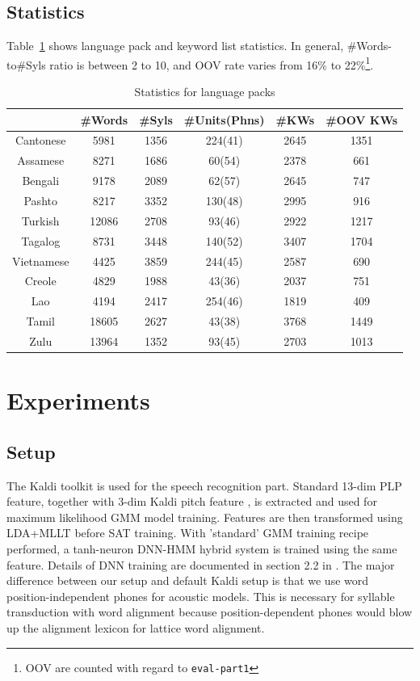\documentclass[journal]{IEEEtran}
\begin{document}
\subsection{Statistics}
Table~\ref{tab:stats} shows language pack and keyword list statistics. In general, \#Words-to\#Syls ratio is 
between 2 to 10, and OOV rate varies from 16\% to 22\%\footnote{OOV are counted with regard to \texttt{eval-part1}}.

\begin{table}[!t]
  \caption{Statistics for language packs}
  \label{tab:stats}
  \centering
  \begin{tabular}{|c|c|c|c|c|c|}
    \hline
    & \#Words & \#Syls & \#Units(Phns) & \#KWs & \#OOV KWs \\
    \hline
    Cantonese & 5981    & 1356   & 224(41)    &  2645 & 1351 \\
    Assamese  & 8271    & 1686   & 60(54)     &  2378 & 661 \\
    Bengali   & 9178    & 2089   & 62(57)     &  2645 & 747 \\
    Pashto    & 8217    & 3352   & 130(48)    &  2995 & 916 \\
    Turkish   & 12086   & 2708   & 93(46)     &  2922 & 1217 \\
    Tagalog   & 8731    & 3448   & 140(52)    &  3407 & 1704 \\
    Vietnamese& 4425    & 3859   & 244(45)    &  2587 & 690 \\
    Creole    & 4829    & 1988   & 43(36)     &  2037 & 751 \\
    Lao       & 4194    & 2417   & 254(46)    &  1819 & 409 \\
    Tamil     & 18605   & 2627   & 43(38)     &  3768 & 1449 \\
    Zulu      & 13964   & 1352   & 93(45)     &  2703 & 1013 \\
    \hline
  \end{tabular}
\end{table}

\section{Experiments}
\subsection{Setup}
The Kaldi toolkit\cite{povey2011kaldi} is used for the speech recognition part. 
Standard 13-dim PLP feature, together with 3-dim Kaldi pitch feature \cite{ghahremani2014pitch}, 
is extracted and used for maximum likelihood GMM model training. Features are then transformed 
using LDA+MLLT before SAT training. With 'standard' GMM training recipe performed, a tanh-neuron 
DNN-HMM hybrid system is trained using the same feature. Details of DNN training are documented in 
section 2.2 in \cite{zhang2014improving}. The major difference between our setup and default Kaldi 
setup is that we use word position-independent phones for acoustic models. This is necessary for syllable 
transduction with word alignment because position-dependent phones would blow up the alignment 
lexicon for lattice word alignment.
\end{document}
